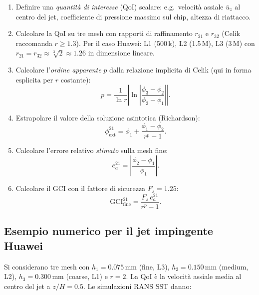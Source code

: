 \documentclass[11pt,a4paper]{article}
\begin{document}
\begin{infobox}
\begin{enumerate}
  \item Definire una \emph{quantità di interesse} (QoI) scalare:
    e.g.\ velocità assiale $\bar u_z$ al centro del jet, coefficiente
    di pressione massimo sul chip, altezza di riattacco.
  \item Calcolare la QoI su tre mesh con rapporti di raffinamento
    $r_{21}$ e $r_{32}$ (Celik raccomanda $r \geq 1.3$). Per il caso
    Huawei: L1 (500\,k), L2 (1.5\,M), L3 (3\,M) con
    $r_{21}=r_{32}\approx \sqrt[3]{2}\approx 1.26$ in dimensione
    lineare.
  \item Calcolare l'\emph{ordine apparente} $p$ dalla relazione
    implicita di Celik (qui in forma esplicita per $r$ costante):
    \begin{equation}
      p = \frac{1}{\ln r}\left|\ln\left|
        \frac{\phi_3 - \phi_2}{\phi_2 - \phi_1}\right|\right|.
    \end{equation}
  \item Estrapolare il valore della soluzione asintotica (Richardson):
    \begin{equation}
      \phi_{\mathrm{ext}}^{21} = \phi_1 + \frac{\phi_1 - \phi_2}{r^p - 1}.
    \end{equation}
  \item Calcolare l'errore relativo \emph{stimato} sulla mesh fine:
    \begin{equation}
      e_a^{21} = \left|\frac{\phi_2 - \phi_1}{\phi_1}\right|.
    \end{equation}
  \item Calcolare il GCI con il fattore di sicurezza $F_s = 1.25$:
    \begin{equation}
      \boxed{\mathrm{GCI}_{\mathrm{fine}}^{21}
        = \frac{F_s\,e_a^{21}}{r^p-1}.}
    \end{equation}
\end{enumerate}
\end{infobox}

\subsection{Esempio numerico per il jet impingente Huawei}

Si considerano tre mesh con $h_1 = 0.075\mathrm{\,mm}$ (fine, L3),
$h_2 = 0.150\mathrm{\,mm}$ (medium, L2), $h_3 = 0.300\mathrm{\,mm}$
(coarse, L1) e $r = 2$. La QoI è la velocità assiale media al centro
del jet a $z/H = 0.5$. Le simulazioni RANS SST danno:
\end{document}
